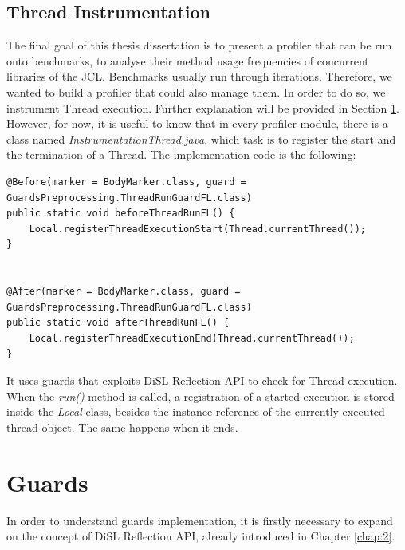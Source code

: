 \documentclass[]{usiinfthesis}
\begin{document}
\subsection{Thread Instrumentation}
The final goal of this thesis dissertation is to present a profiler that can be run onto benchmarks, to analyse their method usage frequencies of concurrent libraries of the JCL. Benchmarks usually run through iterations. Therefore, we wanted to build a profiler that could also manage them. In order to do so, we instrument Thread execution. Further explanation will be provided in Section \ref{sec:5.4}. However, for now, it is useful to know that in every profiler module, there is a class named \textit{InstrumentationThread.java}, which task is to register the start and the termination of a Thread. The implementation code is the  following:

\vspace*{0.5cm}
\begin{verbatim}
@Before(marker = BodyMarker.class, guard = GuardsPreprocessing.ThreadRunGuardFL.class)
public static void beforeThreadRunFL() {
    Local.registerThreadExecutionStart(Thread.currentThread());
}


@After(marker = BodyMarker.class, guard = GuardsPreprocessing.ThreadRunGuardFL.class)
public static void afterThreadRunFL() {
    Local.registerThreadExecutionEnd(Thread.currentThread());
}
\end{verbatim}
\vspace*{0.5cm}

\noindent
It uses guards that exploits DiSL Reflection API \cite{DiSLReflectionAPI} to check for Thread execution. When the \textit{run()} method is called, a registration of a started execution is stored inside the \textit{Local} class, besides the instance reference of the currently executed thread object. The same happens when it ends.

\section{Guards} \label{sec:5.4}
In order to understand guards implementation, it is firstly necessary to expand on the concept of DiSL Reflection API, already introduced in Chapter \ref{chap:2}.
\end{document}
